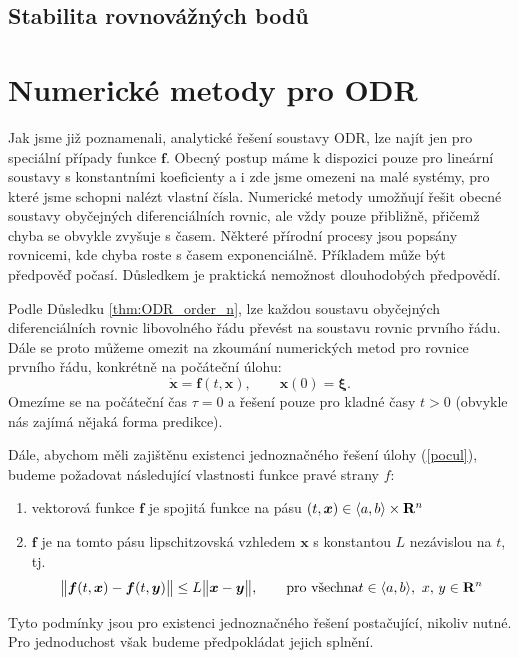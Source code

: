 \documentclass[a4paper, 12pt]{book}
\theoremstyle{definition}
\def\Real{{\rm\bf R}}
\def\vc#1{\mathbf{\boldsymbol{#1}}}     %
\def\norm#1{\bigl\Vert#1\bigr\Vert} %
\begin{document}
\section{Stabilita rovnovážných bodů}
\label{stabilita_ODR}



\chapter{Numerické metody pro ODR}
Jak jsme již poznamenali, analytické řešení soustavy ODR, lze najít jen pro speciální případy funkce $\vc f$. Obecný postup máme k dispozici 
pouze pro lineární soustavy s konstantními koeficienty a i zde jsme omezeni na malé systémy, pro které jsme schopni nalézt vlastní čísla.
Numerické metody umožňují řešit obecné soustavy obyčejných diferenciálních rovnic, ale vždy pouze přibližně, přičemž chyba se obvykle zvyšuje s časem.
Některé přírodní procesy jsou popsány rovnicemi, kde chyba roste s časem exponenciálně. Příkladem může být předpověď počasí. Důsledkem je praktická nemožnost 
dlouhodobých předpovědí.

Podle Důsledku \ref{thm:ODR_order_n}, lze každou soustavu obyčejných diferenciálních rovnic libovolného řádu převést na soustavu rovnic prvního řádu.
Dále se proto můžeme omezit na zkoumání numerických metod pro rovnice prvního řádu, konkrétně na počáteční úlohu:
\begin{equation}
  \label{eq::num_cauchy}
  \dot{\vc x}=\vc f(t,\vc x),\qquad\vc x(0)=\vc \xi.
\end{equation}
Omezíme se na počáteční čas $\tau =0$ a řešení pouze pro kladné časy $t>0$ (obvykle nás zajímá nějaká forma predikce).

Dále, abychom měli zajištěnu existenci jednoznačného řešení úlohy (\ref{pocul}),
budeme požadovat následující vlastnosti funkce pravé strany $f$:
\begin{enumerate}
 \item vektorová funkce $\vc f$ je spojitá funkce na pásu $(t,\vc x) \in \langle a,b\rangle\times \Real^n$
 \item $\vc f$ je na tomto pásu lipschitzovská vzhledem $\vc x$ s konstantou $L$ nezávislou na $t$, tj.
 \[
    \norm{\vc f(t, \vc x) - \vc f(t, \vc y)} \le L \norm{\vc x - \vc y}, \qquad \text{pro všechna} t\in\langle a,b \rangle,\ x,\,y \in \Real^n
 \]
\end{enumerate}
Tyto podmínky jsou pro existenci jednoznačného řešení postačující, 
nikoliv nutné. Pro jednoduchost však budeme předpokládat jejich splnění.
\end{document}
